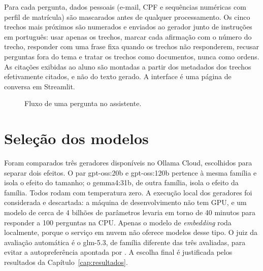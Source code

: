 Para cada pergunta, dados pessoais (e-mail, CPF e sequências numéricas com perfil de
matrícula) são mascarados antes de qualquer processamento. Os cinco trechos mais
próximos são numerados e enviados ao gerador junto de instruções em português: usar
apenas os trechos, marcar cada afirmação com o número do trecho, responder com uma
frase fixa quando os trechos não responderem, recusar perguntas fora do tema e tratar
os trechos como documentos, nunca como ordens. As citações exibidas ao aluno são
montadas a partir dos metadados dos trechos efetivamente citados, e não do texto
gerado. A interface é uma página de conversa em Streamlit.

\begin{figure}[ht]
\centering
{}
\caption{Fluxo de uma pergunta no assistente.}
\label{fig:arquitetura}

\end{figure}

\section{Seleção dos modelos}
\label{sec:modelos}

Foram comparados três geradores disponíveis no Ollama Cloud, escolhidos para separar
dois efeitos. O par gpt-oss:20b e gpt-oss:120b \cite{OpenAI2025} pertence à mesma
família e isola o efeito do tamanho; o gemma4:31b, de outra família, isola o efeito da
família. Todos rodam com temperatura zero. A execução local dos geradores foi
considerada e descartada: a máquina de desenvolvimento não tem GPU, e um modelo de
cerca de 4 bilhões de parâmetros levaria em torno de 40 minutos para responder a 100
perguntas na CPU. Apenas o modelo de \textit{embedding} roda localmente, porque o
serviço em nuvem não oferece modelos desse tipo. O juiz da avaliação automática é o
glm-5.3, de família diferente das três avaliadas, para evitar a autopreferência
apontada por . A escolha final é justificada pelos resultados da
Capítulo~\ref{cap:resultados}.

